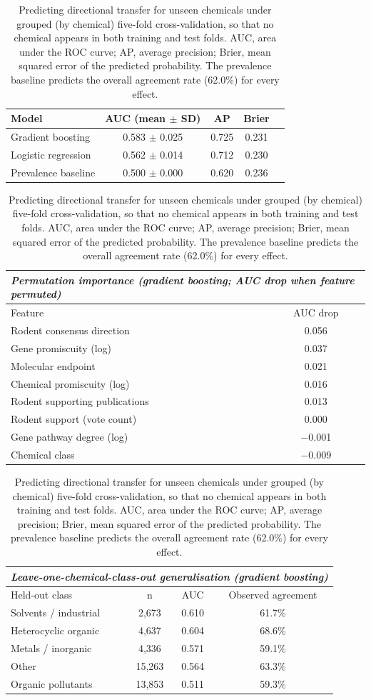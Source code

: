 \documentclass[11pt]{elsarticle}
\begin{document}
\begin{table}[H]
\small
\centering
\caption{Predicting directional transfer for unseen chemicals under grouped
(by chemical) five-fold cross-validation, so that no chemical appears in both
training and test folds. AUC, area under the ROC curve; AP, average precision;
Brier, mean squared error of the predicted probability. The prevalence baseline
predicts the overall agreement rate (62.0\%) for every effect.}
\label{tab:s6}
\begin{tabular}{lcccc}
\toprule
Model & AUC (mean $\pm$ SD) & AP & Brier \\
\midrule
Gradient boosting & 0.583 $\pm$ 0.025 & 0.725 & 0.231 \\
Logistic regression & 0.562 $\pm$ 0.014 & 0.712 & 0.230 \\
Prevalence baseline & 0.500 $\pm$ 0.000 & 0.620 & 0.236 \\
\bottomrule
\end{tabular}

\vspace{8pt}

\begin{tabular}{lc}
\multicolumn{2}{l}{\textit{Permutation importance (gradient boosting; AUC drop when feature permuted)}} \\
\toprule
Feature & AUC drop \\
\midrule
Rodent consensus direction & 0.056 \\
Gene promiscuity (log) & 0.037 \\
Molecular endpoint & 0.021 \\
Chemical promiscuity (log) & 0.016 \\
Rodent supporting publications & 0.013 \\
Rodent support (vote count) & 0.000 \\
Gene pathway degree (log) & $-$0.001 \\
Chemical class & $-$0.009 \\
\bottomrule
\end{tabular}

\vspace{8pt}

\begin{tabular}{lccc}
\multicolumn{4}{l}{\textit{Leave-one-chemical-class-out generalisation (gradient boosting)}} \\
\toprule
Held-out class & n & AUC & Observed agreement \\
\midrule
Solvents / industrial & 2{,}673 & 0.610 & 61.7\% \\
Heterocyclic organic & 4{,}637 & 0.604 & 68.6\% \\
Metals / inorganic & 4{,}336 & 0.571 & 59.1\% \\
Other & 15{,}263 & 0.564 & 63.3\% \\
Organic pollutants & 13{,}853 & 0.511 & 59.3\% \\
\bottomrule
\end{tabular}
\end{table}
\end{document}
